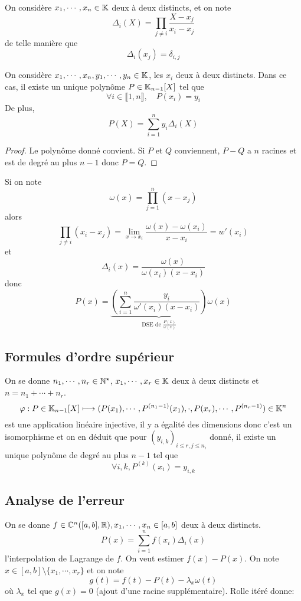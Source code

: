 On considère $x_1, \cdots, x_n\in\mathbb K$ deux à deux distincts, et on note \[
    \Delta_i(X)=\prod_{j\neq i}\frac{X-x_j}{x_i-x_j}
\]
de telle manière que \[
    \Delta_i(x_j)=\delta_{i, j}
\]

\begin{thm}
    On considère $x_1, \cdots, x_n, y_1, \cdots, y_n\in\mathbb K$, les $x_i$ deux à deux distincts. Dans ce cas, il existe un unique polynôme $P\in\mathbb K_{n-1}[X]$ tel que \[\forall i\in\llbracket 1, n\rrbracket, \quad P(x_i)=y_i\]
    De plus, \[
        P(X)=\sum_{i=1}^ny_i\Delta_i(X)
    \]
\end{thm}

\begin{proof}
Le polynôme donné convient. Si $P$ et $Q$ conviennent, $P-Q$ a $n$ racines et est de degré au plus $n-1$ donc $P=Q$.
\end{proof}

\begin{rem}
Si on note \[
    \omega (x)=\prod_{j=1}^n(x-x_j)
\]
alors \[
    \prod_{j\neq i}(x_i-x_j)=\lim_{x\to x_i}\frac{\omega(x)-\omega(x_i)}{x-x_i}=w'(x_i)
\]
et \[
    \Delta_i(x)=\frac{\omega (x)}{\omega(x_i)(x-x_i)}
\]
donc \[
    P(x)=\underbrace{\left(\sum_{i=1}^n\frac{y_i}{\omega'(x_i)(x-x_i)}\right)}_{\text{DSE de }\frac{P(x)}{\omega(x)}}\omega(x)
\]
\end{rem}

\subsection{Formules d'ordre supérieur}

On se donne $n_1, \cdots, n_r\in\mathbb N^\star$, $x_1, \cdots, x_r\in\mathbb K$ deux à deux distincts et $n=n_1+\cdots+n_r$. \[
    \varphi: P\in\mathbb K_{n-1}[X]\longmapsto(P(x_1), \cdots, P^{(n_1-1)}(x_1), \cdot, P(x_r), \cdots, P^{(n_r-1)})\in\mathbb K^n
\]
est une application linéaire injective, il y a égalité des dimensions donc c'est un isomorphisme et on en déduit que pour $(y_{i, k})_{i\leq r, j\leq n_i}$ donné, il existe un unique polynôme de degré au plus $n-1$ tel que \[
    \forall i, k, P^{(k)}(x_i)=y_{i, k}
\]

\subsection{Analyse de l'erreur}

On se donne $f\in\mathbb C^n([a, b], \mathbb R) ,x_1, \cdots, x_n\in [a, b]$ deux à deux distincts. \[
    P(x)=\sum_{i=1}^nf (x_i)\Delta_i(x)
\]
l'interpolation de Lagrange de $f$. On veut estimer $f(x)-P(x)$. On note $x\in [a, b]\setminus\{x_1, \cdots, x_r\}$ et on note \[
    g(t)=f(t)-P(t)-\lambda_x\omega(t)
\]
où $\lambda_x$ tel que $g(x)=0$ (ajout d'une racine supplémentaire). Rolle itéré donne:

